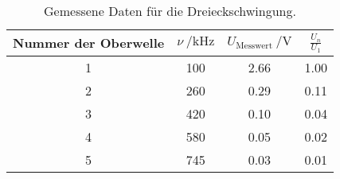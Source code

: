 \begin{table}[H]
  \centering
   \begin{tabular}{c c c c}
    \toprule
    Nummer der Oberwelle & $ \nu \: / \si{\kHz}$ & $ U_{\text{Messwert}}\: / \si{\volt} $ &
    $ \frac{U_{n}}{U_{1}} $\\
    \midrule
    1 & 100 & 2.66 & 1.00 \\
    2 & 260 & 0.29 & 0.11 \\
    3 & 420 & 0.10 & 0.04 \\
    4 & 580 & 0.05 & 0.02 \\
    5 & 745 & 0.03 & 0.01 \\
    \bottomrule
  \end{tabular}
  \caption{Gemessene Daten für die Dreieckschwingung.}
  \label{tab:tabe2}
\end{table}
